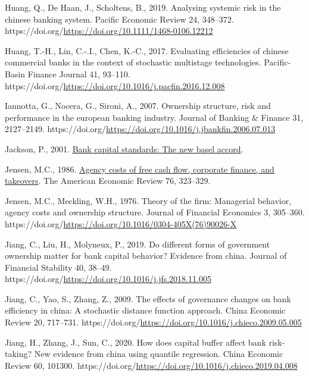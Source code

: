 \documentclass[
  letterpaper,
  DIV=11,
  numbers=noendperiod]{scrreprt}
\newlength{\cslhangindent}
\newenvironment{CSLReferences}[2] %
 {\begin{list}{}{%
  \setlength{\itemindent}{0pt}
  \setlength{\leftmargin}{0pt}
  \setlength{\parsep}{0pt}
  \ifodd #1
   \setlength{\leftmargin}{\cslhangindent}
   \setlength{\itemindent}{-1\cslhangindent}
  \fi
  \setlength{\itemsep}{#2\baselineskip}}}
 {\end{list}}
\begin{document}
\begin{CSLReferences}{1}{0}
Huang, Q., De Haan, J., Scholtens, B., 2019. Analysing systemic risk in
the chinese banking system. Pacific Economic Review 24, 348--372.
https://doi.org/\url{https://doi.org/10.1111/1468-0106.12212}

Huang, T.-H., Lin, C.-.I., Chen, K.-C., 2017. Evaluating efficiencies of
chinese commercial banks in the context of stochastic multistage
technologies. Pacific-Basin Finance Journal 41, 93--110.
https://doi.org/\url{https://doi.org/10.1016/j.pacfin.2016.12.008}

Iannotta, G., Nocera, G., Sironi, A., 2007. Ownership structure, risk
and performance in the european banking industry. Journal of Banking \&
Finance 31, 2127--2149.
https://doi.org/\url{https://doi.org/10.1016/j.jbankfin.2006.07.013}

Jackson, P., 2001.
\href{https://www.bankofengland.co.uk/quarterly-bulletin/2001/q1/2001-bank-capital-standards-the-new-basel-accord}{Bank
capital standards: The new basel accord}.

Jensen, M.C., 1986.
\href{http://www.jstor.org.queens.ezp1.qub.ac.uk/stable/1818789}{Agency
costs of free cash flow, corporate finance, and takeovers}. The American
Economic Review 76, 323--329.

Jensen, M.C., Meckling, W.H., 1976. Theory of the firm: Managerial
behavior, agency costs and ownership structure. Journal of Financial
Economics 3, 305--360.
https://doi.org/\url{https://doi.org/10.1016/0304-405X(76)90026-X}

Jiang, C., Liu, H., Molyneux, P., 2019. Do different forms of government
ownership matter for bank capital behavior? Evidence from china. Journal
of Financial Stability 40, 38--49.
https://doi.org/\url{https://doi.org/10.1016/j.jfs.2018.11.005}

Jiang, C., Yao, S., Zhang, Z., 2009. The effects of governance changes
on bank efficiency in china: A stochastic distance function approach.
China Economic Review 20, 717--731.
https://doi.org/\url{https://doi.org/10.1016/j.chieco.2009.05.005}

Jiang, H., Zhang, J., Sun, C., 2020. How does capital buffer affect bank
risk-taking? New evidence from china using quantile regression. China
Economic Review 60, 101300.
https://doi.org/\url{https://doi.org/10.1016/j.chieco.2019.04.008}


\end{CSLReferences}
\end{document}
